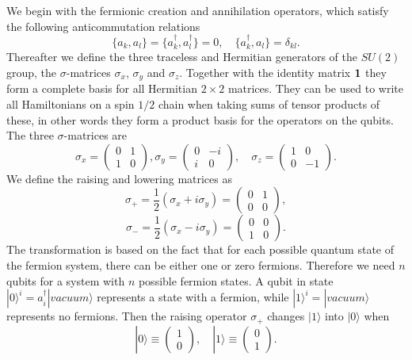 We begin with the  fermionic creation and annihilation operators, which satisfy the following
anticommutation relations
\begin{equation}
\label{eq:anticommutationrelations}
\{a_k, a_l\}=\{a_k^\dag, a_l^\dag\}= 0, \quad 
\{a_k^\dag, a_l\} = \delta_{kl}.
\end{equation}
Thereafter we define the three traceless and Hermitian generators of the $SU(2)$ group, the
$\sigma$-matrices $\sigma_x$, $\sigma_y$ and $\sigma_z$.  Together 
with the
identity matrix ${\bf 1}$ they form a complete basis for all Hermitian $2\times2$
matrices. They can be used to write all Hamiltonians on a spin $1/2$
chain when taking sums of tensor products of these, in other words  
they form a product basis for the operators on the qubits.
The three $\sigma$-matrices are
\begin{equation}
\sigma_x = \begin{pmatrix}
  0 & 1\\
  1 & 0 
\end{pmatrix},
\sigma_y = \begin{pmatrix}
  0 & -i\\
  i & 0 
\end{pmatrix}, \quad
\sigma_z = \begin{pmatrix}
  1 & 0\\
  0 & -1 
\end{pmatrix}.
\end{equation}
We define the raising and lowering matrices as
\[
\sigma_+ = \frac{1}{2}(\sigma_x + i\sigma_y)=
\begin{pmatrix}
  0 & 1\\
  0 & 0 
\end{pmatrix},
\]
\begin{equation}
\label{eq:raisingAndLowerin}
\sigma_- = \frac{1}{2}(\sigma_x - i\sigma_y)
=\begin{pmatrix}
  0 & 0\\
  1 & 0 
\end{pmatrix}.
\end{equation}
The transformation is based on the fact that for each possible
quantum state of the fermion system, there can be either one or zero
fermions. Therefore we need $n$ qubits for a system with $n$ possible
fermion states. A qubit in state $ |0\rangle ^i=a^\dag_i|vacuum\rangle$ 
represents a state with a
fermion, while $ |1\rangle ^i=|vacuum\rangle$ represents no fermions. Then the raising
operator $\sigma_+$ changes $ |1\rangle $ into $ |0\rangle $ when
\begin{equation}
 |0\rangle  \equiv \begin{pmatrix} 1 \\ 0 \end{pmatrix}, \quad
 |1\rangle  \equiv \begin{pmatrix} 0 \\ 1 \end{pmatrix}.
\end{equation}  
